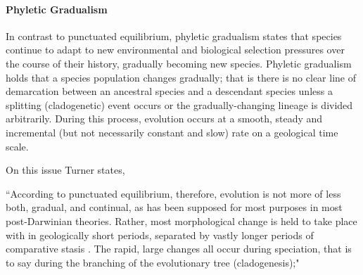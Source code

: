 \paragraph{Phyletic Gradualism}
In contrast to punctuated equilibrium, phyletic gradualism states that species continue to adapt to new environmental and biological selection pressures over the course of their history, gradually becoming new species. Phyletic gradualism holds that a species population changes gradually; that is there is no clear line of demarcation between an ancestral species and a descendant species unless a splitting (cladogenetic) event occurs or the gradually-changing lineage is divided arbitrarily. During this process, evolution occurs at a smooth, steady and incremental (but not necessarily constant and slow) rate on a geological time scale. 

On this issue Turner states,

``According to punctuated equilibrium, therefore, evolution is not more of less both, gradual, and continual, as has been supposed for most purposes in most post-Darwinian theories. Rather, most morphological change is held to take place with in geologically short periods, separated by vastly longer periods of comparative stasis \cite{eldredge1972}. The rapid, large changes all occur during speciation, that is to say during the branching of the evolutionary tree (cladogenesis);" \cite{turner1988}

